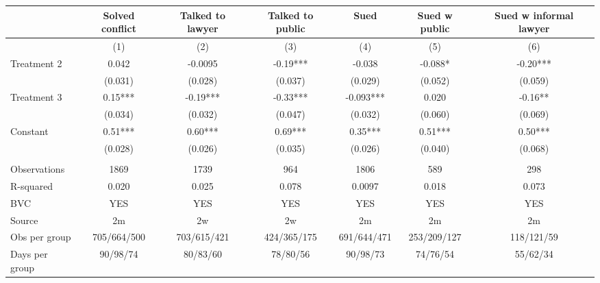 \begin{tabular}{lcccccc}
\toprule
      & Solved conflict & Talked to lawyer & Talked to public  & Sued  & Sued w public & Sued w informal lawyer \\
\midrule
\midrule
      & (1)   & (2)   & (3)   & (4)   & (5)   & (6) \\
\midrule
\midrule
Treatment 2 & 0.042 & -0.0095 & -0.19*** & -0.038 & -0.088* & -0.20*** \\
      & (0.031) & (0.028) & (0.037) & (0.029) & (0.052) & (0.059) \\
Treatment 3 & 0.15*** & -0.19*** & -0.33*** & -0.093*** & 0.020 & -0.16** \\
      & (0.034) & (0.032) & (0.047) & (0.032) & (0.060) & (0.069) \\
Constant  & 0.51*** & 0.60*** & 0.69*** & 0.35*** & 0.51*** & 0.50*** \\
      & (0.028) & (0.026) & (0.035) & (0.026) & (0.040) & (0.068) \\
      &       &       &       &       &       &  \\
\midrule
Observations & 1869  & 1739  & 964   & 1806  & 589   & 298 \\
R-squared & 0.020 & 0.025 & 0.078 & 0.0097 & 0.018 & 0.073 \\
BVC   & YES   & YES   & YES   & YES   & YES   & YES \\
Source & 2m    & 2w    & 2w    & 2m    & 2m    & 2m \\
Obs per group & 705/664/500 & 703/615/421 & 424/365/175 & 691/644/471 & 253/209/127 & 118/121/59 \\
Days per group & 90/98/74 & 80/83/60 & 78/80/56 & 90/98/73 & 74/76/54 & 55/62/34 \\
\bottomrule
\bottomrule
\end{tabular}%
